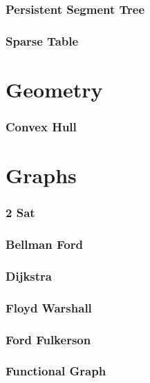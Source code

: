 \documentclass[12pt, a4paper]{report}
\let\oldsection\section
\renewcommand{\section}{\clearpage\oldsection}
\begin{document}
\section{Persistent Segment Tree}

\section{Sparse Table}


\part{Geometry}
\setcounter{section}{0}

\section{Convex Hull}


\part{Graphs}
\setcounter{section}{0}
\section{2 Sat}

\section{Bellman Ford}

\section{Dijkstra}

\section{Floyd Warshall}

\section{Ford Fulkerson}

\section{Functional Graph}

\end{document}
